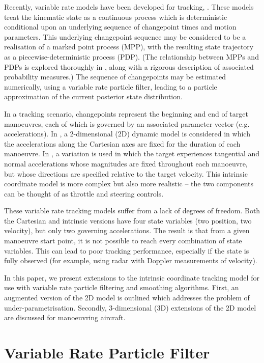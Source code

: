 \documentclass[conference]{IEEEtran}
\begin{document}
Recently, variable rate models have been developed for tracking, \cite{Godsill2007a,Godsill2007,Whiteley2011}. These models treat the kinematic state as a continuous process which is deterministic conditional upon an underlying sequence of changepoint times and motion parameters. This underlying changepoint sequence may be considered to be a realisation of a marked point process (MPP), with the resulting state trajectory as a piecewise-deterministic process (PDP). (The relationship between MPPs and PDPs is explored thoroughly in \cite{Jacobsen2006}, along with a rigorous description of associated probability measures.) The sequence of changepoints may be estimated numerically, using a variable rate particle filter, leading to a particle approximation of the current posterior state distribution.

In a tracking scenario, changepoints represent the beginning and end of target manoeuvres, each of which is governed by an associated parameter vector (e.g. accelerations). In \cite{Whiteley2011}, a 2-dimensional (2D) dynamic model is considered in which the accelerations along the Cartesian axes are fixed for the duration of each manoeuvre. In \cite{Godsill2007}, a variation is used in which the target experiences tangential and normal accelerations whose magnitudes are fixed throughout each manoeuvre, but whose directions are specified relative to the target velocity. This intrinsic coordinate model is more complex but also more realistic -- the two components can be thought of as throttle and steering controls.

These variable rate tracking models suffer from a lack of degrees of freedom. Both the Cartesian and intrinsic versions have four state variables (two position, two velocity), but only two governing accelerations. The result is that from a given manoeuvre start point, it is not possible to reach every combination of state variables. This can lead to poor tracking performance, especially if the state is fully observed (for example, using radar with Doppler measurements of velocity).

In this paper, we present extensions to the intrinsic coordinate tracking model for use with variable rate particle filtering and smoothing algorithms. First, an augmented version of the 2D model is outlined which addresses the problem of under-parametrisation. Secondly, 3-dimensional (3D) extensions of the 2D model are discussed for manoeuvring aircraft.



\section{Variable Rate Particle Filter}
\end{document}
